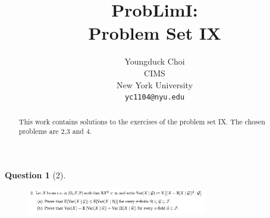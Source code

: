 \documentclass{article} %
\title{ProbLimI: \\
Problem Set IX}
\author{
Youngduck Choi \\
CIMS \\
New York University\\
\texttt{yc1104@nyu.edu} \\
}
\theoremstyle{quest}
\newtheorem*{question}{Question}
\begin{document}
\maketitle

\begin{abstract}
This work contains solutions to the exercises of the problem set IX. The
chosen problems are 2,3 and 4.
\end{abstract}

\bigskip


\begin{question}[2]
\hfill
\begin{figure}[h!]
  \centering
    \includegraphics[width=0.7\textwidth]{problim-e9-p2.png}
\end{figure}
\end{question}
\end{document}
